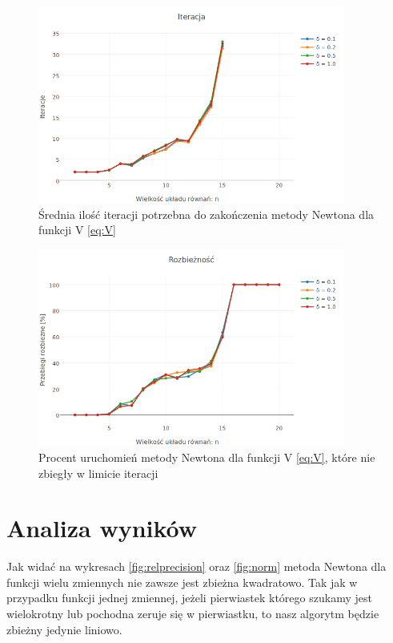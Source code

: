 \documentclass[11pt,wide]{mwart}
\begin{document}
\begin{figure}[h]
    \centering
    \includegraphics[width=0.9\textwidth]{avg_iterations_V}
    \caption{Średnia ilość iteracji potrzebna do zakończenia metody Newtona dla funkcji V \eqref{eq:V}}
    \label{fig:avgiterationsV}
\end{figure}
\begin{figure}[h]
    \centering
    \includegraphics[width=0.9\textwidth]{avg_diversions_V}
    \caption{Procent uruchomień metody Newtona dla funkcji V \eqref{eq:V}, które nie zbiegły w limicie iteracji}
    \label{fig:avgdiversionsV}
\end{figure}
\FloatBarrier
\section{Analiza wyników}
Jak widać na wykresach \ref{fig:relprecision} oraz \ref{fig:norm} metoda Newtona dla funkcji wielu zmiennych nie zawsze jest zbieżna kwadratowo. Tak jak w przypadku funkcji jednej zmiennej, jeżeli pierwiastek którego szukamy jest wielokrotny lub pochodna zeruje się w pierwiastku, to nasz algorytm będzie zbieżny jedynie liniowo.
\end{document}
